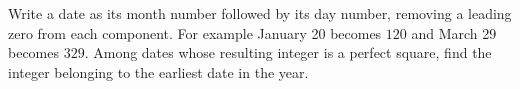 Write a date as its month number followed by its day number, removing a leading zero from each component. For example January 20 becomes $120$ and March 29 becomes $329$. Among dates whose resulting integer is a perfect square, find the integer belonging to the earliest date in the year.
